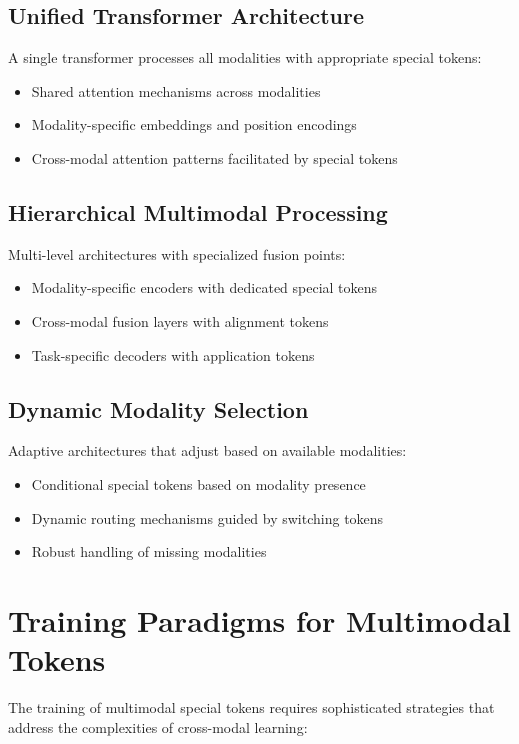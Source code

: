\subsection{Unified Transformer Architecture}
A single transformer processes all modalities with appropriate special tokens:
\begin{itemize}
\item Shared attention mechanisms across modalities
\item Modality-specific embeddings and position encodings
\item Cross-modal attention patterns facilitated by special tokens
\end{itemize}

\subsection{Hierarchical Multimodal Processing}
Multi-level architectures with specialized fusion points:
\begin{itemize}
\item Modality-specific encoders with dedicated special tokens
\item Cross-modal fusion layers with alignment tokens
\item Task-specific decoders with application tokens
\end{itemize}

\subsection{Dynamic Modality Selection}
Adaptive architectures that adjust based on available modalities:
\begin{itemize}
\item Conditional special tokens based on modality presence
\item Dynamic routing mechanisms guided by switching tokens
\item Robust handling of missing modalities
\end{itemize}

\section{Training Paradigms for Multimodal Tokens}

The training of multimodal special tokens requires sophisticated strategies that address the complexities of cross-modal learning:

